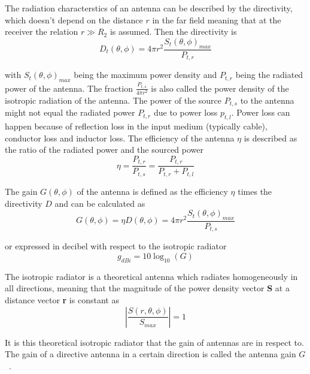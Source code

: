 The radiation characterstics of an antenna can be described by the directivity, which doesn't depend on the distance $r$ in the far field meaning that at the receiver the relation $r \gg  R_2$ is assumed. Then the directivity is
\begin{equation} \label{eq:directivity}
    D_t\left(\theta, \phi\right) = 4 \pi r^2 \frac{S_t \left(\theta, \phi\right)_{max}}{P_{t,r}}
\end{equation}

with $S_ t\left(\theta, \phi\right)_{max}$ being the maximum power density and $P_{t,r}$ being the radiated power of the antenna. The fraction $\frac{P_{t,s}}{4 \pi r^2}$ is also called the power density of the isotropic radiation of the antenna. The power of the source $P_{t,s}$ to the antenna might not equal the radiated power $P_{t,r}$ due to power loss $p_{t,l}$. Power loss can happen because of reflection loss in the input medium (typically cable), conductor loss and inductor loss. The efficiency of the antenna $\eta$ is described as the ratio of the radiated power and the sourced power %
\begin{equation} \label{eq:antenna_efficiency}
    \eta = \frac{P_{t,r}}{P_{t,s}} = \frac{P_{t,r}}{P_{t,r}+P_{t,l}}
\end{equation}

The gain $G \left( \theta, \phi \right)$ of the antenna is defined as the efficiency $\eta$ times the directivity $D$ and can be calculated as
\begin{equation} \label{eq:gain}
    G \left( \theta, \phi \right) = \eta  D\left(\theta, \phi\right) = 4 \pi r^2 \frac{S_t \left(\theta, \phi\right)_{max}}{P_{t,s}}
\end{equation}

or expressed in decibel with respect to the isotropic radiator
\begin{equation} \label{eq:gain_dbi}
    g_{dBi} = 10 \log_{10}\left(G\right)
\end{equation}

The isotropic radiator is a theoretical antenna which radiates homogeneously in all directions, meaning that the magnitude of the power density vector \textbf{S} at a distance vector \textbf{r} is constant as
\begin{equation} \label{eq:isotropic_radiation}
    \left| \frac{S \left(r, \theta, \phi \right)}{S_{max}} \right|=1
\end{equation}

It is this theoretical isotropic radiator that the gain of antennas are in respect to. The gain of a directive antenna in a certain direction is called the antenna gain $G$~\cite[pp. 10-12]{ant_beam_form}.

